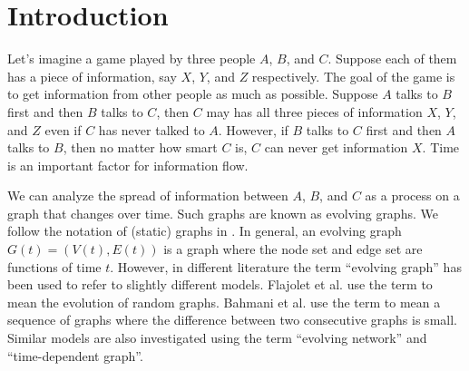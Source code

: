 \documentclass[11pt,conference,compsocconf]{IEEEtran}
\theoremstyle{definition}
\begin{document}
\section{Introduction}

Let's imagine a game played by three people
$A$, $B$, and $C$. Suppose each of them has a piece of information,
say $X$, $Y$, and $Z$ respectively. The goal of the game is
to get information from other people as much as possible.
Suppose $A$ talks to $B$ first and then $B$ talks to $C$,
then $C$ may has all three pieces of information $X$, $Y$, and $Z$ even
if $C$ has never talked to $A$.
However, if $B$ talks to $C$ first and then $A$ talks to $B$, then
no matter how smart $C$ is, $C$ can never get information
$X$.  Time is an important factor for information flow.

We can analyze the spread of information between $A$, $B$, and $C$
as a process on a graph that changes over time.
Such graphs are known as evolving graphs.
We follow the notation of (static) graphs in \cite{even12,kegi11}.
In general, an evolving graph $G(t) = (V(t), E(t))$ is  a graph where the node set
and edge set are functions of time $t$.
However, in different literature the term ``evolving graph'' has been
used to refer to slightly different models.
 Flajolet et al. \cite{fkp89} use the term to mean the evolution of random graphs.
Bahmani et al. \cite{bkmu12} use the term to mean a sequence of graphs where
the difference between two consecutive graphs is small.
Similar models are also investigated using the term ``evolving network'' and
``time-dependent graph''.
\end{document}
